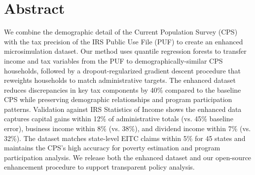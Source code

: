 \section*{Abstract}

We combine the demographic detail of the Current Population Survey (CPS) with the tax precision of the IRS Public Use File (PUF) to create an enhanced microsimulation dataset. Our method uses quantile regression forests to transfer income and tax variables from the PUF to demographically-similar CPS households, followed by a dropout-regularized gradient descent procedure that reweights households to match administrative targets. The enhanced dataset reduces discrepancies in key tax components by 40\% compared to the baseline CPS while preserving demographic relationships and program participation patterns. Validation against IRS Statistics of Income shows the enhanced data captures capital gains within 12\% of administrative totals (vs. 45\% baseline error), business income within 8\% (vs. 38\%), and dividend income within 7\% (vs. 32\%). The dataset matches state-level EITC claims within 5\% for 45 states and maintains the CPS's high accuracy for poverty estimation and program participation analysis. We release both the enhanced dataset and our open-source enhancement procedure to support transparent policy analysis.